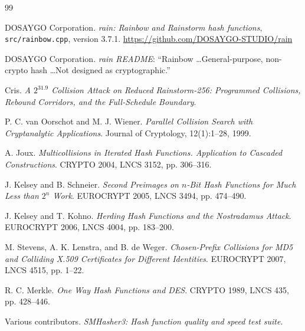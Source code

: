 \documentclass[10pt]{article}
\theoremstyle{definition}
\newcommand{\code}[1]{\texttt{#1}}
\begin{document}
\begin{thebibliography}{99}

DOSAYGO Corporation.
\newblock \emph{rain: Rainbow and Rainstorm hash functions}, \code{src/rainbow.cpp}, version 3.7.1.
\newblock \url{https://github.com/DOSAYGO-STUDIO/rain}

DOSAYGO Corporation.
\newblock \emph{rain README}: ``Rainbow \dots General-purpose, non-crypto hash \dots Not designed as cryptographic.''

Cris.
\newblock \emph{A $2^{31.9}$ Collision Attack on Reduced Rainstorm-256: Programmed Collisions, Rebound Corridors, and the Full-Schedule Boundary}.

P. C. van Oorschot and M. J. Wiener.
\newblock \emph{Parallel Collision Search with Cryptanalytic Applications}.
\newblock Journal of Cryptology, 12(1):1--28, 1999.

A. Joux.
\newblock \emph{Multicollisions in Iterated Hash Functions. Application to Cascaded Constructions}.
\newblock CRYPTO 2004, LNCS 3152, pp. 306--316.

J. Kelsey and B. Schneier.
\newblock \emph{Second Preimages on $n$-Bit Hash Functions for Much Less than $2^n$ Work}.
\newblock EUROCRYPT 2005, LNCS 3494, pp. 474--490.

J. Kelsey and T. Kohno.
\newblock \emph{Herding Hash Functions and the Nostradamus Attack}.
\newblock EUROCRYPT 2006, LNCS 4004, pp. 183--200.

M. Stevens, A. K. Lenstra, and B. de Weger.
\newblock \emph{Chosen-Prefix Collisions for MD5 and Colliding X.509 Certificates for Different Identities}.
\newblock EUROCRYPT 2007, LNCS 4515, pp. 1--22.

R. C. Merkle.
\newblock \emph{One Way Hash Functions and DES}.
\newblock CRYPTO 1989, LNCS 435, pp. 428--446.

Various contributors.
\newblock \emph{SMHasher3: Hash function quality and speed test suite}.

\end{thebibliography}
\end{document}
